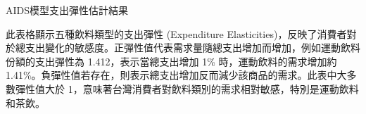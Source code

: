 %     

\begin{table}[H]
    \caption{AIDS模型支出彈性估計結果} \label{aids_exp}
    \center
    
\end{table}
\vspace{-2em}
\begin{singlespace}
    \begin{footnotesize}
        \raggedright
         此表格顯示五種飲料類型的支出彈性 (Expenditure Elasticities)，反映了消費者對於總支出變化的敏感度。正彈性值代表需求量隨總支出增加而增加，例如運動飲料份額的支出彈性為 1.412，表示當總支出增加 1\% 時，運動飲料的需求增加約 1.41\%。負彈性值若存在，則表示總支出增加反而減少該商品的需求。此表中大多數彈性值大於 1，意味著台灣消費者對飲料類別的需求相對敏感，特別是運動飲料和茶飲。
    \end{footnotesize}
\end{singlespace}

